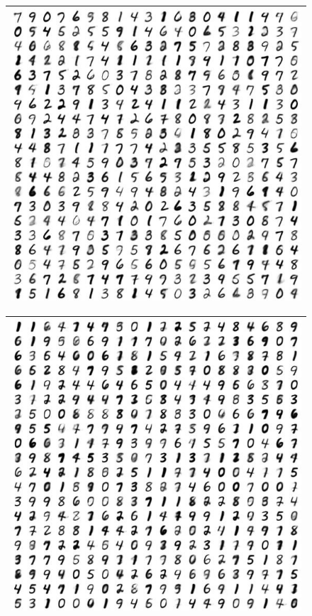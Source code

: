 \documentclass[letterpaper, twoside]{article}
\begin{document}
\begin{figure}[h]
\centering
\begin{minipage}{.5\textwidth}
\centering
\begin{tabular}{|@{}c@{}|}
\hline
\includegraphics[scale=0.7]{manifold_28.jpg}\\\hline
\end{tabular}
\end{minipage}%
\begin{minipage}{.5\textwidth}
\centering
\begin{tabular}{|@{}c@{}|}
\hline
\includegraphics[scale=0.7]{manifold_39.jpg}\\\hline

\end{tabular}
\end{minipage}
\end{figure}
\end{document}
